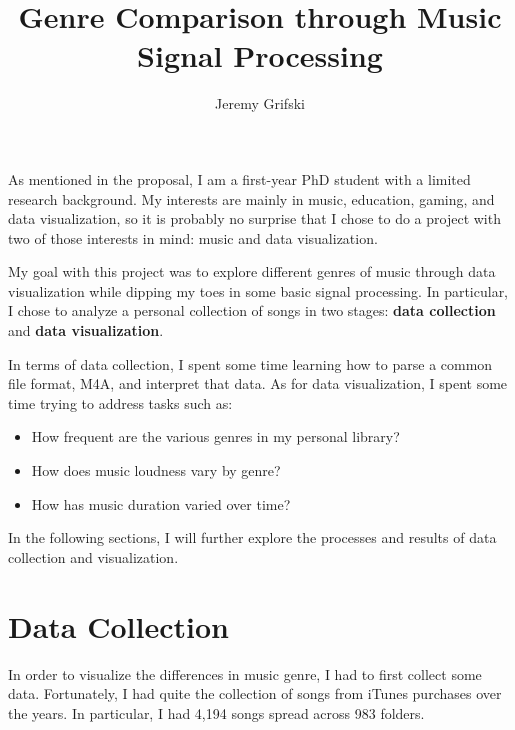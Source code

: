\documentclass[journal]{vgtc}                %
\title{Genre Comparison through Music Signal Processing}
\author{Jeremy Grifski}
\begin{document}


\maketitle

As mentioned in the proposal, I am a first-year PhD student with a limited
research background. My interests are mainly in music, education, gaming, and
data visualization, so it is probably no surprise that I chose to do a project
with two of those interests in mind: music and data visualization.

My goal with this project was to explore different genres of music through
data visualization while dipping my toes in some basic signal processing.
In particular, I chose to analyze a personal collection of songs in two
stages: \textbf{data collection} and \textbf{data visualization}.

In terms of data collection, I spent some time learning how to parse a common
file format, M4A, and interpret that data. As for data visualization, I spent
some time trying to address tasks such as:

\begin{itemize}
  \item How frequent are the various genres in my personal library?
  \item How does music loudness vary by genre?
  \item How has music duration varied over time?
\end{itemize}

In the following sections, I will further explore the processes and results of
data collection and visualization.

\section{Data Collection}

In order to visualize the differences in music genre, I had to first collect
some data. Fortunately, I had quite the collection of songs from iTunes purchases
over the years. In particular, I had 4,194 songs spread across 983 folders.
\end{document}
